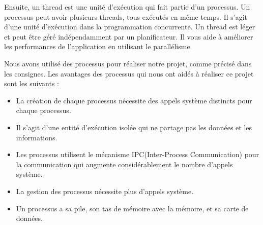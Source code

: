 \documentclass[utf8]{article}
\begin{document}
Ensuite, un thread est une unité d'exécution qui fait partie d'un processus. Un processus peut avoir plusieurs threads, tous exécutés en même temps. Il s'agit d'une unité d'exécution dans la programmation concurrente. Un thread est léger et peut être géré indépendamment par un planificateur. Il vous aide à améliorer les performances de l'application en utilisant le parallélisme.

Nous avons utilisé des processus pour réaliser notre projet, comme précisé dans les consignes. Les avantages des processus qui nous ont aidés à réaliser ce projet sont les suivants :\\
\begin{itemize}
    \item La création de chaque processus nécessite des appels système distincts pour chaque processus.\\
    \item Il s'agit d'une entité d'exécution isolée qui ne partage pas les données et les informations.\\
    \item Les processus utilisent le mécanisme IPC(Inter-Process Communication) pour la communication qui augmente considérablement le nombre d'appels système.\\
    \item La gestion des processus nécessite plus d'appels système.\\
    \item Un processus a sa pile, son tas de mémoire avec la mémoire, et sa carte de données.\\
\end{itemize}
\par
\end{document}
